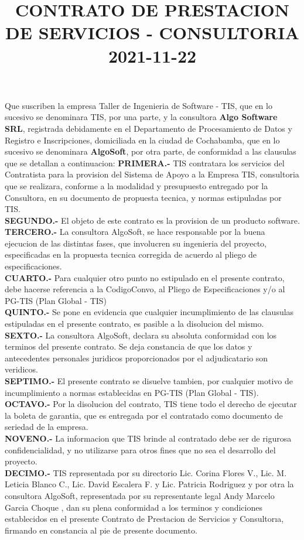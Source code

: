 \documentclass[10pt,letterpaper]{article}
\title{ \textbf{CONTRATO DE PRESTACION DE SERVICIOS - CONSULTORIA }\\2021-11-22}\date{}
\begin{document}
\maketitle


Que suscriben la empresa Taller de Ingenieria de Software - TIS, que en lo sucesivo se denominara TIS, por
una parte, y la consultora \textbf{Algo Software SRL}, registrada debidamente en el Departamento de Procesamiento de Datos y Registro e Inscripciones, domiciliada en la ciudad de Cochabamba, que en lo sucesivo se
denominara \textbf{AlgoSoft}, por otra parte, de conformidad a las clausulas que se detallan a continuacion:
\textbf{PRIMERA.-} TIS contratara los servicios del Contratista para la provision del Sistema de Apoyo a la Empresa
TIS, consultoria que se realizara, conforme a la modalidad y presupuesto entregado por la Consultora, en su
documento de propuesta tecnica, y normas estipuladas por TIS.\\
\textbf{SEGUNDO.-} El objeto de este contrato es la provision de un producto software.\\
\textbf{TERCERO.-} La consultora AlgoSoft, se hace responsable por la buena ejecucion de las distintas fases, que
involucren su ingenieria del proyecto, especificadas en la propuesta tecnica corregida de acuerdo al pliego de
especificaciones.\\
\textbf{CUARTO.-} Para cualquier otro punto no estipulado en el presente contrato, debe hacerse referencia a la
{CodigoConvo}, al Pliego de Especificaciones y/o al PG-TIS (Plan Global - TIS)\\
\textbf{QUINTO.-} Se pone en evidencia que cualquier incumplimiento de las clausulas estipuladas en el presente
contrato, es pasible a la disolucion del mismo.\\
\textbf{SEXTO.-} La consultora AlgoSoft, declara su absoluta conformidad con los terminos del presente contrato.
Se deja constancia de que los datos y antecedentes personales juridicos proporcionados por el adjudicatario son
veridicos.\\
\textbf{SEPTIMO.-} El presente contrato se disuelve tambien, por cualquier motivo de incumplimiento a normas establecidas en PG-TIS (Plan Global - TIS).\\
\textbf{OCTAVO.-} Por la disolucion del contrato, TIS tiene todo el derecho de ejecutar la boleta de garantia, que es
entregada por el contratado como documento de seriedad de la empresa.\\
\textbf{NOVENO.-} La informacion que TIS brinde al contratado debe ser de rigurosa confidencialidad, y no utilizarse
para otros fines que no sea el desarrollo del proyecto.\\
\textbf{DECIMO.-} TIS representada por su directorio Lic. Corina Flores V., Lic. M. Leticia Blanco C., Lic. David
Escalera F. y Lic. Patricia Rodriguez y por otra la consultora AlgoSoft, representada por su representante
legal Andy Marcelo Garcia Choque , dan su plena conformidad a los terminos y condiciones establecidos en el
presente Contrato de Prestacion de Servicios y Consultorıa, firmando en constancia al pie de presente documento.\\
\end{document}
